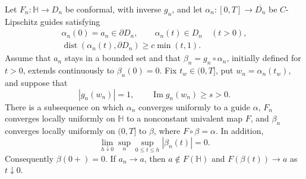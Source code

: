 \begin{lemma}\label{es:guide-compactness}
Let $F_n:\mathbb H\to D_n$ be conformal, with inverse $g_n$, and let
$\alpha_n:[0,T]\to\overline{D_n}$ be $C$-Lipschitz guides satisfying
\[
 \begin{gathered}
 \alpha_n(0)=a_n\in\partial D_n,\qquad
 \alpha_n(t)\in D_n\quad(t>0),\\
 \operatorname{dist}(\alpha_n(t),\partial D_n)
       \ge c\min(t,1).
 \end{gathered}
\]
Assume that $a_n$ stays in a bounded set and that
$\beta_n=g_n\circ\alpha_n$, initially defined for $t>0$, extends
continuously to $\beta_n(0)=0$.  Fix $t_w\in(0,T]$, put
$w_n=\alpha_n(t_w)$, and suppose that
\[
 |g_n(w_n)|=1,\qquad \operatorname{Im}g_n(w_n)\ge s>0.
\]
There is a subsequence on which $\alpha_n$ converges uniformly to a
guide $\alpha$, $F_n$ converges locally uniformly on $\mathbb H$ to a
nonconstant univalent map $F$, and $\beta_n$ converges locally uniformly
on $(0,T]$ to $\beta$, where $F\circ\beta=\alpha$.  In addition,
\begin{equation}\label{es:uniform-tip-collapse}
 \lim_{h\downarrow0}\sup_n\sup_{0\le t\le h}|\beta_n(t)|=0.
\end{equation}
Consequently $\beta(0+)=0$.  If $a_n\to a$, then $a\notin F(\mathbb H)$
and $F(\beta(t))\to a$ as $t\downarrow0$.
\end{lemma}

